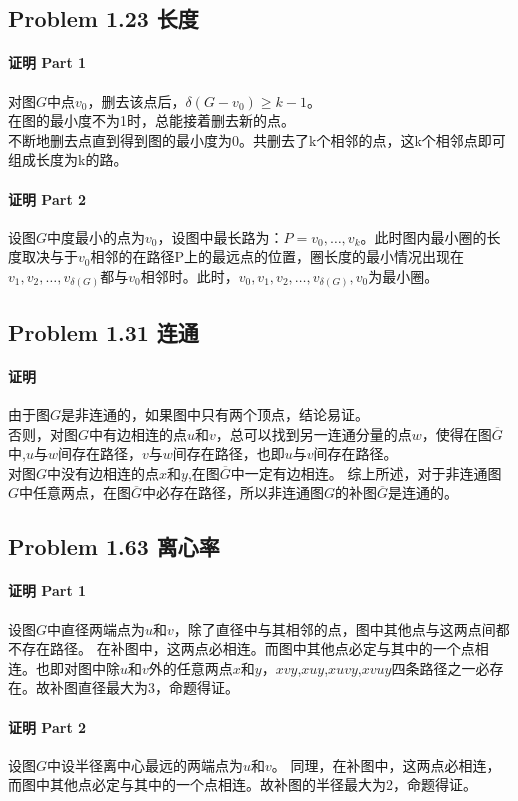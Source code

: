 \documentclass[17pt,UTF-8,a4paper]{ctexart}
\begin{document}
\subsection*{Problem 1.23 长度} 
\paragraph*{证明 Part 1}
对图$G$中点$v_0$，删去该点后，$\delta({G-v_0})\geq{k-1}$。\\
在图的最小度不为1时，总能接着删去新的点。\\  
不断地删去点直到得到图的最小度为0。共删去了k个相邻的点，这k个相邻点即可组成长度为k的路。


\paragraph*{证明 Part 2}
设图$G$中度最小的点为$v_0$，设图中最长路为：$P=v_0,\dots,v_k$。此时图内最小圈的长度取决与于$v_0$相邻的在路径P上的最远点的位置，圈长度的最小情况出现在$v_1,v_2,\dots,v_{\delta(G)}$都与$v_0$相邻时。此时，$v_0,v_1,v_2,\dots,v_{\delta(G)},v_0$为最小圈。

\subsection*{Problem 1.31 连通}
\paragraph*{证明}
由于图$G$是非连通的，如果图中只有两个顶点，结论易证。\\
否则，对图$G$中有边相连的点$u$和$v$，总可以找到另一连通分量的点$w$，使得在图$\overline{G}$中,$u$与$w$间存在路径，$v$与$w$间存在路径，也即$u$与$v$间存在路径。\\
对图$G$中没有边相连的点$x$和$y$,在图$\overline{G}$中一定有边相连。
综上所述，对于非连通图$G$中任意两点，在图$\overline{G}$中必存在路径，所以非连通图$G$的补图$\overline{G}$是连通的。

\subsection*{Problem 1.63 离心率}
\paragraph*{证明 Part 1}
设图$G$中直径两端点为$u$和$v$，除了直径中与其相邻的点，图中其他点与这两点间都不存在路径。
在补图中，这两点必相连。而图中其他点必定与其中的一个点相连。也即对图中除$u$和$v$外的任意两点$x$和$y$，$xvy$,$xuy$,$xuvy$,$xvuy$四条路径之一必存在。故补图直径最大为3，命题得证。



\paragraph*{证明 Part 2}
设图$G$中设半径离中心最远的两端点为$u$和$v$。
同理，在补图中，这两点必相连，而图中其他点必定与其中的一个点相连。故补图的半径最大为2，命题得证。
\end{document}
